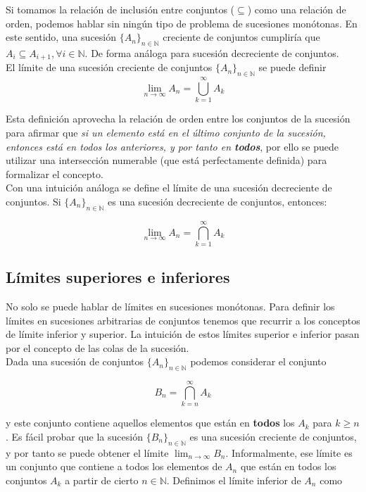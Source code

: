 Si tomamos la relación de inclusión entre conjuntos ($\subseteq$) como una relación de orden, podemos hablar sin ningún tipo de problema de sucesiones monótonas. En este sentido, una sucesión   $\{A_n\}_{n \in \mathbb{N}}$  creciente de conjuntos cumpliría que $A_i \subseteq A_{i+1}, \forall i \in \mathbb{N}$. De forma análoga para sucesión decreciente de conjuntos.\\

El límite de una sucesión creciente de conjuntos $\{A_n\}_{n \in \mathbb{N} }$ se puede definir
$$\lim_{n\to\infty} A_n = \bigcup_{k=1}^{\infty} A_k$$

Esta definición aprovecha la relación de orden entre los conjuntos de la sucesión para afirmar que \textit{si un elemento está en el último conjunto de la sucesión, entonces está en todos los anteriores, y por tanto en \textbf{todos}}, por ello se puede utilizar una intersección numerable (que está perfectamente definida) para formalizar el concepto.\\

Con una intuición análoga se define el límite de una sucesión decreciente de conjuntos. Si $\{A_n\}_{n\in\mathbb{N}}$ es una sucesión decreciente de conjuntos, entonces:

$$ \lim_{n\to\infty} A_n = \bigcap_{k=1}^{\infty} A_k $$

\subsection{Límites superiores e inferiores}

No solo se puede hablar de límites en sucesiones monótonas. 
Para definir los límites en sucesiones arbitrarias de conjuntos tenemos que recurrir a los conceptos de límite inferior y superior. 
La intuición de estos límites superior e inferior pasan por el concepto de las colas de la sucesión.\\

Dada una sucesión de conjuntos $\{A_n\}_{n\in\mathbb{N} }$ podemos considerar el conjunto

$$ B_n = \bigcap_{k=n}^{\infty} A_k $$

y este conjunto contiene aquellos elementos que están en \textbf{todos} los $A_k$ para $k \geq n$. Es fácil probar que la sucesión $\{B_n\}_{n\in\mathbb{N}}$ es una sucesión creciente de conjuntos, y por tanto se puede obtener el límite $\lim_{n\to\infty} B_n$. Informalmente, ese límite es un conjunto que contiene a todos los elementos de $A_n$ que están en todos los conjuntos $A_k$ a partir de cierto $n\in\mathbb{N}$. Definimos el límite inferior de $A_n$ como

